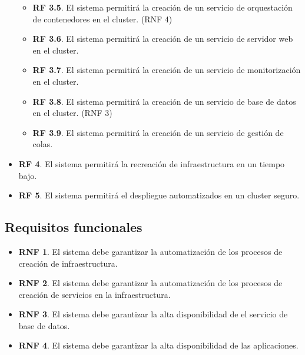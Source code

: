 \begin{itemize}
\begin{itemize}
			\item \textbf{RF 3.5}. El sistema permitirá la creación de un servicio de orquestación de contenedores en el cluster. (RNF 4)
			\item \textbf{RF 3.6}. El sistema permitirá la creación de un servicio de servidor web en el cluster.
			\item \textbf{RF 3.7}. El sistema permitirá la creación de un servicio de monitorización en el cluster.
			\item \textbf{RF 3.8}. El sistema permitirá la creación de un servicio de base de datos en el cluster. (RNF 3)
			\item \textbf{RF 3.9}. El sistema permitirá la creación de un servicio de gestión de colas.
		\end{itemize}
	
	\item \textbf{RF 4}. El sistema permitirá la recreación de infraestructura en un tiempo bajo.
	
	\item \textbf{RF 5}. El sistema permitirá el despliegue automatizados en un cluster seguro.
	\end{itemize}

	\subsection{Requisitos funcionales}
	\begin{itemize}
		\item \textbf{RNF 1}. El sistema debe garantizar la automatización de los procesos de creación de infraestructura.
		\item \textbf{RNF 2}. El sistema debe garantizar la automatización de los procesos de creación de servicios en la infraestructura.
		\item \textbf{RNF 3}. El sistema debe garantizar la alta disponibilidad de el servicio de base de datos.
		\item \textbf{RNF 4}. El sistema debe garantizar la alta disponibilidad de las aplicaciones.
	\end{itemize}

